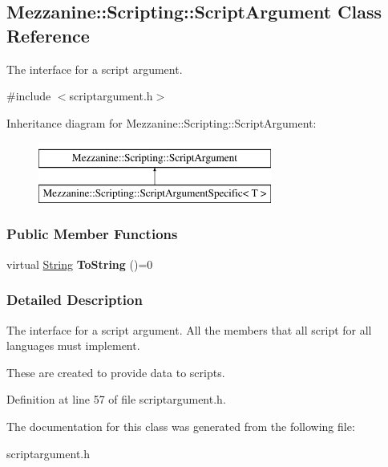 \hypertarget{classMezzanine_1_1Scripting_1_1ScriptArgument}{
\subsection{Mezzanine::Scripting::ScriptArgument Class Reference}
\label{classMezzanine_1_1Scripting_1_1ScriptArgument}
}


The interface for a script argument.  




{\ttfamily \#include $<$scriptargument.h$>$}

Inheritance diagram for Mezzanine::Scripting::ScriptArgument:\begin{figure}[H]
\begin{center}
\leavevmode
\includegraphics[height=2.000000cm]{classMezzanine_1_1Scripting_1_1ScriptArgument}
\end{center}
\end{figure}
\subsubsection*{Public Member Functions}
\begin{DoxyCompactItemize}
\item 
\hypertarget{classMezzanine_1_1Scripting_1_1ScriptArgument_a3390632f9d61d53782b7aace79dab8dc}{
virtual \hyperlink{namespaceMezzanine_acf9fcc130e6ebf08e3d8491aebcf1c86}{String} {\bfseries ToString} ()=0}
\label{classMezzanine_1_1Scripting_1_1ScriptArgument_a3390632f9d61d53782b7aace79dab8dc}

\end{DoxyCompactItemize}


\subsubsection{Detailed Description}
The interface for a script argument. All the members that all script for all languages must implement. \par
 \par
 These are created to provide data to scripts. 

Definition at line 57 of file scriptargument.h.



The documentation for this class was generated from the following file:\begin{DoxyCompactItemize}
\item 
scriptargument.h\end{DoxyCompactItemize}
